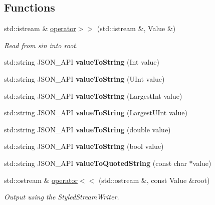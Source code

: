 \subsection*{Functions}
\begin{DoxyCompactItemize}
\item 
std\+::istream \& \hyperlink{namespace_json_a4d245ef719cc0853e8e78eb5f99c16e5}{operator$>$$>$} (std\+::istream \&, Value \&)
\begin{DoxyCompactList}\small\item\em Read from \textquotesingle{}sin\textquotesingle{} into \textquotesingle{}root\textquotesingle{}. \end{DoxyCompactList}\item 
\mbox{\label{namespace_json_a5d3eba6789f9a9c1ab563ff8b4a5090f}} 
std\+::string J\+S\+O\+N\+\_\+\+A\+PI {\bfseries value\+To\+String} (Int value)
\item 
\mbox{\label{namespace_json_a4d43b0ff222bd3975bcf1babca0b978f}} 
std\+::string J\+S\+O\+N\+\_\+\+A\+PI {\bfseries value\+To\+String} (U\+Int value)
\item 
\mbox{\label{namespace_json_abd9c650f70d9434f98f9025e2e2faf2d}} 
std\+::string J\+S\+O\+N\+\_\+\+A\+PI {\bfseries value\+To\+String} (Largest\+Int value)
\item 
\mbox{\label{namespace_json_a3f46b0bc62b95a9426a2da0117bdf9f0}} 
std\+::string J\+S\+O\+N\+\_\+\+A\+PI {\bfseries value\+To\+String} (Largest\+U\+Int value)
\item 
\mbox{\label{namespace_json_a99995d7dafa4f4970b349d7d3c8d1d99}} 
std\+::string J\+S\+O\+N\+\_\+\+A\+PI {\bfseries value\+To\+String} (double value)
\item 
\mbox{\label{namespace_json_a979ed531f091985e22f0051cd2a8e341}} 
std\+::string J\+S\+O\+N\+\_\+\+A\+PI {\bfseries value\+To\+String} (bool value)
\item 
\mbox{\label{namespace_json_aa0c8235a4a5c6599da5d3332743db8ac}} 
std\+::string J\+S\+O\+N\+\_\+\+A\+PI {\bfseries value\+To\+Quoted\+String} (const char $\ast$value)
\item 
std\+::ostream \& \hyperlink{namespace_json_a87bc83d7e90fc666d28aa16727deda2f}{operator$<$$<$} (std\+::ostream \&, const Value \&root)
\begin{DoxyCompactList}\small\item\em Output using the Styled\+Stream\+Writer. \end{DoxyCompactList}\end{DoxyCompactItemize}


